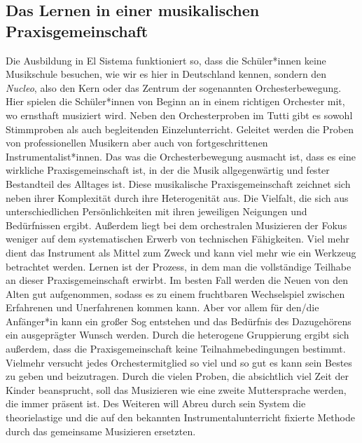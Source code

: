 \subsection{Das Lernen in einer musikalischen Praxisgemeinschaft}
Die Ausbildung in El Sistema funktioniert so, dass die Schüler*innen keine
Musikschule besuchen, wie wir es hier in Deutschland kennen, sondern den
\emph{Nucleo}, also den Kern oder das Zentrum der sogenannten Orchesterbewegung.
Hier spielen die Schüler*innen von Beginn an in einem richtigen Orchester mit,
wo ernsthaft musiziert wird. Neben den Orchesterproben im Tutti gibt es sowohl
Stimmproben als auch begleitenden Einzelunterricht. Geleitet werden die Proben
von professionellen Musikern aber auch von fortgeschrittenen
Instrumentalist*innen.
\autocite[45]{kaufmann:el_sistema} 
Das was die Orchesterbewegung ausmacht ist, dass es eine wirkliche
Praxisgemeinschaft ist, in der die Musik allgegenwärtig und fester Bestandteil
des Alltages ist. Diese musikalische Praxisgemeinschaft zeichnet sich neben
ihrer Komplexität durch ihre Heterogenität aus. Die Vielfalt, die sich aus
unterschiedlichen Persönlichkeiten mit ihren jeweiligen Neigungen und
Bedürfnissen ergibt. \autocite[161]{roebke_mantilla:vom_wilden_lernen} Außerdem
liegt bei dem orchestralen Musizieren der Fokus weniger auf dem systematischen
Erwerb von technischen Fähigkeiten. Viel mehr dient das Instrument als Mittel
zum Zweck und kann viel mehr wie ein Werkzeug betrachtet werden. Lernen ist der
Prozess, in dem man die vollständige Teilhabe an dieser Praxisgemeinschaft
erwirbt. Im besten Fall werden die Neuen von den Alten gut aufgenommen, sodass
es zu einem fruchtbaren Wechselspiel zwischen Erfahrenen und Unerfahrenen kommen
kann. Aber vor allem für den/die Anfänger*in kann ein großer Sog entstehen und
das Bedürfnis des Dazugehörens ein ausgeprägter Wunsch werden. Durch die
heterogene Gruppierung ergibt sich außerdem, dass die Praxisgemeinschaft keine
Teilnahmebedingungen bestimmt. Vielmehr versucht jedes Orchestermitglied so viel
und so gut es kann sein Bestes zu geben und beizutragen. Durch die vielen
Proben, die absichtlich viel Zeit der Kinder beansprucht, soll das Musizieren
wie eine zweite Muttersprache werden, die immer präsent ist.
\autocite[162]{kaufmann:el_sistema} Des Weiteren will Abreu durch sein System
die theorielastige und die auf den bekannten Instrumentalunterricht fixierte
Methode durch das gemeinsame Musizieren ersetzten. 
\autocite[45]{kaufmann:el_sistema}




